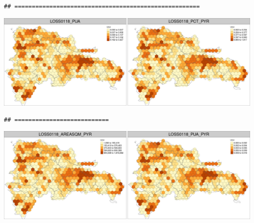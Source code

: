 \documentclass[10pt,landscape,a3paper]{article}
\begin{document}
\begin{verbatim}
## =====================================================
\end{verbatim}

\begin{center}\includegraphics{img/zonal-long-term-grid-8} \end{center}

\begin{verbatim}
## ===========================
\end{verbatim}

\begin{center}\includegraphics{img/zonal-long-term-grid-9} \end{center}
\end{document}
